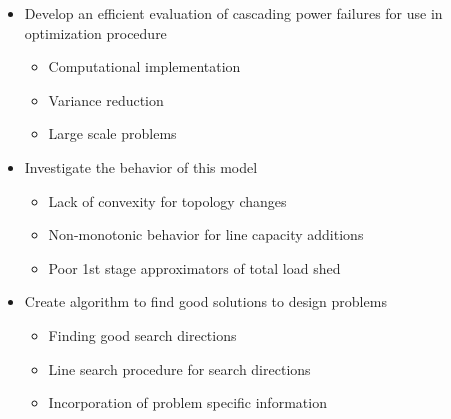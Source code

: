 \begin{itemize}
\item Develop an efficient evaluation of cascading power failures for use in optimization procedure
\begin{itemize}
\item Computational implementation
\item Variance reduction
\item Large scale problems
\end{itemize}
\item Investigate the behavior of this model
\begin{itemize}
\item Lack of convexity for topology changes
\item Non-monotonic behavior for line capacity additions
\item Poor 1st stage approximators of total load shed
\end{itemize}
\item Create algorithm to find good solutions to design problems
\begin{itemize}
\item Finding good search directions
\item Line search procedure for search directions
\item Incorporation of problem specific information
\end{itemize}
\end{itemize}





